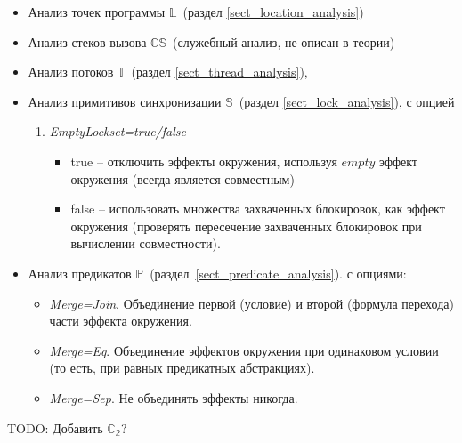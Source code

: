 \begin{itemize}
\item Анализ точек программы $\mathbb{L}$~(раздел \ref{sect_location_analysis})
\item Анализ стеков вызова $\mathbb{CS}$~(служебный анализ, не описан в теории)
\item Анализ потоков $\mathbb{T}$~(раздел \ref{sect_thread_analysis}),
\item Анализ примитивов синхронизации $\mathbb{S}$~(раздел \ref{sect_lock_analysis}), 
с опцией 
\begin{enumerate}
\item {\em EmptyLockset=true/false}
\begin{itemize}
\item true -- отключить эффекты окружения, используя $empty$ эффект окружения (всегда является совместным)
\item false -- использовать множества захваченных блокировок, как эффект окружения (проверять пересечение захваченных блокировок при вычислении совместности).
\end{itemize}
\end{enumerate}

\item Анализ предикатов $\mathbb{P}$~(раздел~\ref{sect_predicate_analysis}).
с опциями:
\begin{itemize}
\item {\em Merge=Join}. Объединение первой (условие) и второй (формула перехода) части эффекта окружения.
\item {\em Merge=Eq}. Объединение эффектов окружения при одинаковом условии (то есть, при равных предикатных абстракциях).
\item {\em Merge=Sep}. Не объединять эффекты никогда.
\end{itemize}
\end{itemize}

TODO: Добавить $\mathbb{C_2}$?

